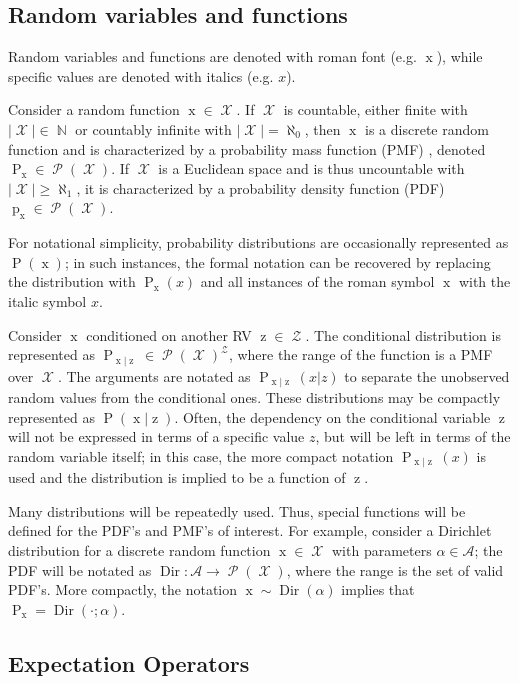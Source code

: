 \documentclass[12pt]{article}
\DeclareMathOperator{\xrm}{\mathrm{x}}
\DeclareMathOperator{\zrm}{\mathrm{z}}
\DeclareMathOperator{\Prm}{\mathrm{P}}
\DeclareMathOperator{\prm}{\mathrm{p}}
\DeclareMathOperator{\Xcal}{\mathcal{X}}
\DeclareMathOperator{\Zcal}{\mathcal{Z}}
\DeclareMathOperator{\Pcal}{\mathcal{P}}
\DeclareMathOperator{\Nbb}{\mathbb{N}}
\DeclareMathOperator{\Dir}{\mathrm{Dir}}
\begin{document}
\subsection*{Random variables and functions}

Random variables and functions are denoted with roman font (e.g. $\xrm$), while specific values are denoted with italics (e.g. $x$). 

Consider a random function $\xrm \in \Xcal$. If $\Xcal$ is countable, either finite with $|\Xcal| \in \Nbb$ or countably infinite with $|\Xcal| = \aleph_0$, then $\xrm$ is a discrete random function and is characterized by a probability mass function (PMF) \cite {papoulis}, denoted $\Prm_{\xrm} \in \Pcal(\Xcal)$. If $\Xcal$ is a Euclidean space and is thus uncountable with $|\Xcal| \geq \aleph_1$, it is characterized by a probability density function (PDF) $\prm_{\xrm} \in \Pcal(\Xcal)$.

For notational simplicity, probability distributions are occasionally represented as $\Prm(\xrm)$; in such instances, the formal notation can be recovered by replacing the distribution with $\Prm_{\xrm}(x)$ and all instances of the roman symbol $\xrm$ with the italic symbol $x$. 

Consider $\xrm$ conditioned on another RV $\zrm \in \Zcal$. The conditional distribution is represented as $\Prm_{\xrm | \zrm} \in \Pcal(\Xcal)^{\Zcal}$, where the range of the function is a PMF over $\Xcal$. The arguments are notated as $\Prm_{\xrm | \zrm}(x|z)$ to separate the unobserved random values from the conditional ones. These distributions may be compactly represented as $\Prm(\xrm|\zrm)$. Often, the dependency on the conditional variable $\zrm$ will not be expressed in terms of a specific value $z$, but will be left in terms of the random variable itself; in this case, the more compact notation $\Prm_{\xrm | \zrm}(x)$ is used and the distribution is implied to be a function of $\zrm$.

Many distributions will be repeatedly used. Thus, special functions will be defined for the PDF's and PMF's of interest. For example, consider a Dirichlet distribution for a discrete random function $\xrm \in \Xcal$ with parameters $\alpha \in \mathcal{A}$; the PDF will be notated as $\Dir : \mathcal{A} \to \Pcal(\Xcal)$, where the range is the set of valid PDF's. More compactly, the notation $\xrm \sim \Dir(\alpha)$ implies that $\Prm_{\xrm} = \Dir(\cdot ; \alpha)$.




\subsection*{Expectation Operators}
\end{document}
